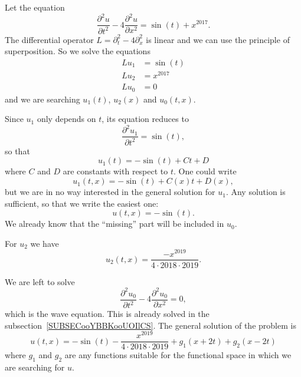 \begin{example}
	Let the equation
	\begin{equation}
		\frac{ \partial^2u }{ \partial t^2 }-4\frac{ \partial^2u }{ \partial x^2 }=\sin(t)+x^{2017}.
	\end{equation}
	The differential operator \( L=\partial_t^2-4\partial_x^2\) is linear and we can use the principle of superposition. So we solve the equations
	\begin{subequations}
		\begin{align}
			Lu_1 & =\sin(t)  \\
			Lu_2 & =x^{2017} \\
			Lu_0 & =0
		\end{align}
	\end{subequations}
	and we are searching \( u_1(t)\), \( u_2(x)\) and \( u_0(t,x)\).

	Since \( u_1\) only depends on \( t\), its equation reduces to
	\begin{equation}
		\frac{ \partial^2u_1 }{ \partial t^2 }=\sin(t),
	\end{equation}
	so that
	\begin{equation}
		u_1(t)=-\sin(t)+Ct+D
	\end{equation}
	where \( C\) and \( D\) are constants with respect to \( t\). One could write
	\begin{equation}
		u_1(t,x)=-\sin(t)+C(x)t+D(x),
	\end{equation}
	but we are in no way interested in the general solution for \( u_1\). Any solution is sufficient, so that we write the easiest one:
	\begin{equation}
		u(t,x)=-\sin(t).
	\end{equation}
	We already know that the ``missing'' part will be included in \( u_0\).

	For \( u_2\) we have
	\begin{equation}
		u_2(t,x)=\frac{ -x^{2019} }{ 4\cdot 2018\cdot 2019 }.
	\end{equation}

	We are left to solve
	\begin{equation}
		\frac{ \partial^2u_0 }{ \partial t^2 }-4\frac{ \partial^2u_0 }{ \partial x^2 }=0,
	\end{equation}
	which is the wave equation. This is already solved in the subsection~\ref{SUBSECooYBBKooUOIlCS}. The general solution of the problem is
	\begin{equation}
		u(t,x)=-\sin(t)-\frac{ x^{2019} }{ 4\cdot 2018\cdot 2019 }+g_1(x+2t)+g_2(x-2t)
	\end{equation}
	where \( g_1\) and \( g_2\) are any functions suitable for the functional space in which we are searching for \( u\).
\end{example}

